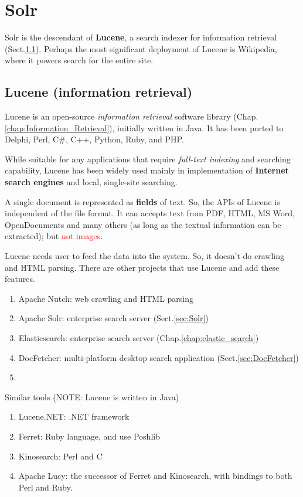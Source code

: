 \chapter{Solr}
\label{chap:Solr}

Solr is the descendant of {\bf Lucene}, a search indexer for information
retrieval (Sect.\ref{sec:Lucene}). Perhaps the most significant deployment of
Lucene is Wikipedia, where it powers search for the entire site.

\section{Lucene (information retrieval)}
\label{sec:Lucene}


Lucene is an open-source {\it information retrieval} software library
(Chap.\ref{chap:Information_Retrieval}), initially written in Java. It has been
ported to  Delphi, Perl, C\#, C++, Python, Ruby, and PHP.

While suitable for any applications that require {\it full-text indexing} and
searching capability, Lucene has been widely used mainly in implementation of
{\bf Internet search engines} and local, single-site searching. 

A single document is represented as {\bf fields} of text. So, the APIs of Lucene
is independent of the file format. It can accepts text from PDF, HTML, MS Word,
OpenDocuments and many others (as long as the textual information can be
extracted); but \textcolor{red}{not images}.

Lucene needs user to feed the data into the system. So, it doesn't do crawling
and HTML parsing. There are other projects that use Lucene and add these
features.
\begin{enumerate}
  \item Apache Nutch: web crawling and HTML parsing
  \item Apache Solr: enterprise search server (Sect.\ref{sec:Solr})
  \item Elasticsearch: enterprise search server (Chap.\ref{chap:elastic_search})
  \item DocFetcher: multi-platform desktop search application
  (Sect.\ref{sec:DocFetcher})
  \item 
\end{enumerate}

Similar tools (NOTE: Lucene is written in Java)
\begin{enumerate}
  \item Lucene.NET: .NET framework
  \item Ferret: Ruby language, and use Poshlib
  \item Kinosearch: Perl and C
  \item Apache Lucy: the successor of Ferret and Kinosearch, with bindings to
  both Perl and Ruby.
\end{enumerate}

